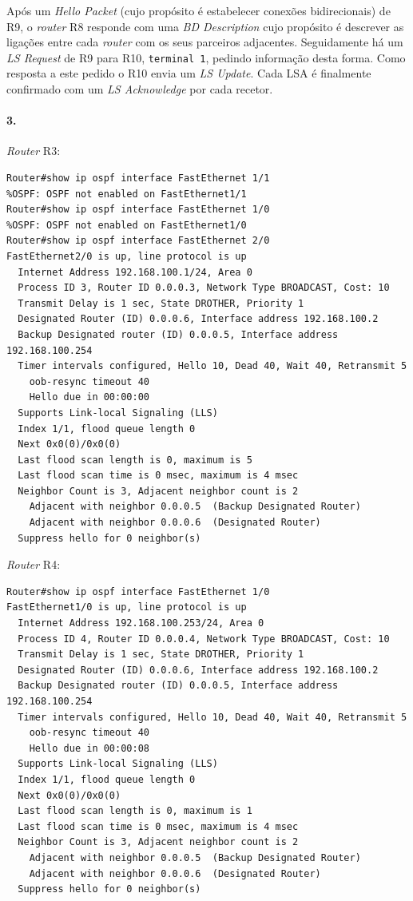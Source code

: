 Após um \emph{Hello Packet} (cujo propósito é estabelecer conexões bidirecionais) de \textsf{R9}, o \emph{router} \textsf{R8} responde com uma \emph{BD Description} cujo propósito é descrever as ligações entre cada \emph{router} com os seus parceiros adjacentes. Seguidamente há um \emph{LS   Request} de \textsf{R9} para \textsf{R10}, \texttt{terminal 1}, pedindo informação desta forma. Como resposta a este pedido o \textsf{R10} envia um \emph{LS Update}. Cada LSA é finalmente confirmado com um \emph{LS Acknowledge} por cada recetor.

\paragraph{3.}
\emph{Router} \textsf{R3}:
\begin{verbatim}
Router#show ip ospf interface FastEthernet 1/1
%OSPF: OSPF not enabled on FastEthernet1/1
Router#show ip ospf interface FastEthernet 1/0
%OSPF: OSPF not enabled on FastEthernet1/0
Router#show ip ospf interface FastEthernet 2/0
FastEthernet2/0 is up, line protocol is up 
  Internet Address 192.168.100.1/24, Area 0 
  Process ID 3, Router ID 0.0.0.3, Network Type BROADCAST, Cost: 10
  Transmit Delay is 1 sec, State DROTHER, Priority 1 
  Designated Router (ID) 0.0.0.6, Interface address 192.168.100.2
  Backup Designated router (ID) 0.0.0.5, Interface address 192.168.100.254
  Timer intervals configured, Hello 10, Dead 40, Wait 40, Retransmit 5
    oob-resync timeout 40
    Hello due in 00:00:00
  Supports Link-local Signaling (LLS)
  Index 1/1, flood queue length 0
  Next 0x0(0)/0x0(0)
  Last flood scan length is 0, maximum is 5
  Last flood scan time is 0 msec, maximum is 4 msec
  Neighbor Count is 3, Adjacent neighbor count is 2 
    Adjacent with neighbor 0.0.0.5  (Backup Designated Router)
    Adjacent with neighbor 0.0.0.6  (Designated Router)
  Suppress hello for 0 neighbor(s)
\end{verbatim}

\emph{Router} \textsf{R4}:
\begin{verbatim}
Router#show ip ospf interface FastEthernet 1/0
FastEthernet1/0 is up, line protocol is up 
  Internet Address 192.168.100.253/24, Area 0 
  Process ID 4, Router ID 0.0.0.4, Network Type BROADCAST, Cost: 10
  Transmit Delay is 1 sec, State DROTHER, Priority 1 
  Designated Router (ID) 0.0.0.6, Interface address 192.168.100.2
  Backup Designated router (ID) 0.0.0.5, Interface address 192.168.100.254
  Timer intervals configured, Hello 10, Dead 40, Wait 40, Retransmit 5
    oob-resync timeout 40
    Hello due in 00:00:08
  Supports Link-local Signaling (LLS)
  Index 1/1, flood queue length 0
  Next 0x0(0)/0x0(0)
  Last flood scan length is 0, maximum is 1
  Last flood scan time is 0 msec, maximum is 4 msec
  Neighbor Count is 3, Adjacent neighbor count is 2 
    Adjacent with neighbor 0.0.0.5  (Backup Designated Router)
    Adjacent with neighbor 0.0.0.6  (Designated Router)
  Suppress hello for 0 neighbor(s)
\end{verbatim}

